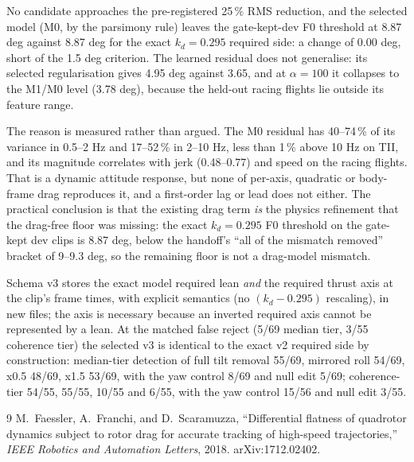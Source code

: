 No candidate approaches the pre-registered 25\,\% RMS reduction, and the selected model
(M0, by the parsimony rule) leaves the gate-kept-dev F0 threshold at 8.87 deg
against 8.87 deg for the exact $k_d=0.295$ required side: a change of 0.00 deg, short of
the 1.5 deg criterion.  The learned residual does not generalise: its selected regularisation gives 4.95 deg
against 3.65, and at $\alpha=100$ it collapses to the M1/M0 level (3.78 deg), because the held-out
racing flights lie outside its feature range.

The reason is measured rather than argued.  The M0 residual has 40--74\,\% of its variance
in 0.5--2 Hz and 17--52\,\% in 2--10 Hz, less than 1\,\% above 10 Hz on TII, and its
magnitude correlates with jerk (0.48--0.77) and speed on the racing flights.  That is a
dynamic attitude response, but none of per-axis, quadratic or body-frame drag reproduces it,
and a first-order lag or lead does not either.  The practical conclusion is that the
existing drag term \emph{is} the physics refinement that the drag-free floor was missing:
the exact $k_d=0.295$ F0 threshold on the gate-kept dev clips is 8.87 deg, below the
handoff's ``all of the mismatch removed'' bracket of 9--9.3 deg, so the remaining floor is
not a drag-model mismatch.

Schema v3 stores the exact model required lean \emph{and} the required thrust axis at the
clip's frame times, with explicit semantics (no $(k_d-0.295)$ rescaling), in new files; the
axis is necessary because an inverted required axis cannot be represented by a lean.
At the matched false reject (5/69 median tier, 3/55 coherence tier) the selected v3 is
identical to the exact v2 required side by construction: median-tier detection of full
tilt removal 55/69, mirrored roll 54/69, x0.5 48/69, x1.5 53/69, with the yaw control
8/69 and null edit 5/69; coherence-tier 54/55, 55/55, 10/55 and 6/55, with the yaw
control 15/56 and null edit 3/55.

\begin{thebibliography}{9}
M.~Faessler, A.~Franchi, and D.~Scaramuzza,
``Differential flatness of quadrotor dynamics subject to rotor drag for accurate tracking
of high-speed trajectories,'' \emph{IEEE Robotics and Automation Letters}, 2018.
arXiv:1712.02402.
\end{thebibliography}

